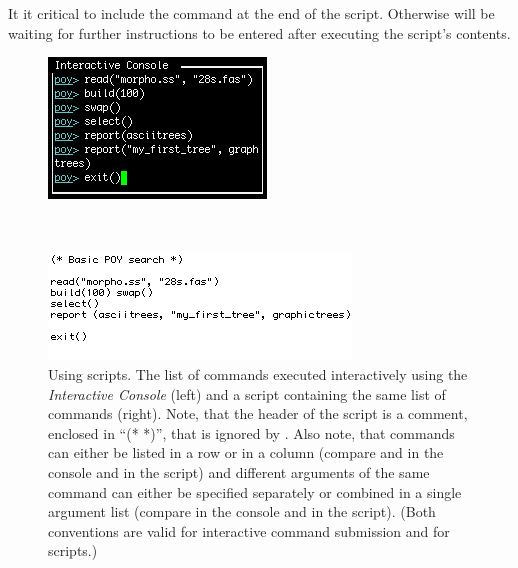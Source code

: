 {It it critical to include the command  at the end of the script. Otherwise \poy will be waiting for further instructions to be entered after executing the script's contents.

\begin{figure}
\centering
\begin{minipage}[c]{0.42\textwidth}
   		\includegraphics[width=\textwidth]{doc/figures/commandlist.jpg}
\end{minipage}
\,
\begin{minipage}[c]{0.53\textwidth}
	   	\includegraphics[width=\textwidth]{doc/figures/script.jpg}
   	\end{minipage}
\caption{Using \poy scripts. The list of commands executed interactively using the \emph{Interactive Console} (left) and a script containing the same list of commands (right). Note, that the header of the script is a comment, enclosed in ``(* *)'', that is ignored by \poy. Also note, that commands can either be listed in a row or in a column (compare  and  in the console and in the script) and different arguments of the same command can either be specified separately or combined in a single argument list (compare  in the console and in the script). (Both conventions are valid for interactive command submission and for scripts.)}
\label{fig:script}
\end{figure}

}
